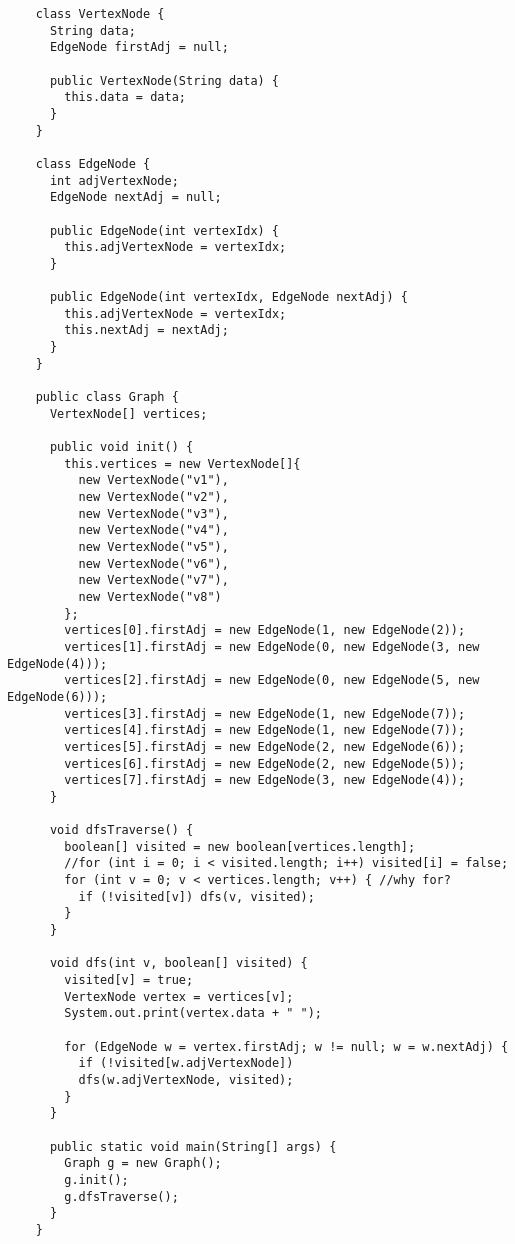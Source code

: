 \begin{frame}
  \begin{verbatim}
    class VertexNode {
      String data;
      EdgeNode firstAdj = null;

      public VertexNode(String data) {
        this.data = data;
      }
    }

    class EdgeNode {
      int adjVertexNode;
      EdgeNode nextAdj = null;

      public EdgeNode(int vertexIdx) {
        this.adjVertexNode = vertexIdx;
      }

      public EdgeNode(int vertexIdx, EdgeNode nextAdj) {
        this.adjVertexNode = vertexIdx;
        this.nextAdj = nextAdj;
      }
    }
    
    public class Graph {
      VertexNode[] vertices;

      public void init() {
        this.vertices = new VertexNode[]{
          new VertexNode("v1"),
          new VertexNode("v2"),
          new VertexNode("v3"),
          new VertexNode("v4"),
          new VertexNode("v5"),
          new VertexNode("v6"),
          new VertexNode("v7"),
          new VertexNode("v8")
        };
        vertices[0].firstAdj = new EdgeNode(1, new EdgeNode(2));
        vertices[1].firstAdj = new EdgeNode(0, new EdgeNode(3, new EdgeNode(4)));
        vertices[2].firstAdj = new EdgeNode(0, new EdgeNode(5, new EdgeNode(6)));
        vertices[3].firstAdj = new EdgeNode(1, new EdgeNode(7));
        vertices[4].firstAdj = new EdgeNode(1, new EdgeNode(7));
        vertices[5].firstAdj = new EdgeNode(2, new EdgeNode(6));
        vertices[6].firstAdj = new EdgeNode(2, new EdgeNode(5));
        vertices[7].firstAdj = new EdgeNode(3, new EdgeNode(4));
      }
      
      void dfsTraverse() {
        boolean[] visited = new boolean[vertices.length];
        //for (int i = 0; i < visited.length; i++) visited[i] = false;
        for (int v = 0; v < vertices.length; v++) { //why for?
          if (!visited[v]) dfs(v, visited);
        }
      }

      void dfs(int v, boolean[] visited) {
        visited[v] = true;
        VertexNode vertex = vertices[v];
        System.out.print(vertex.data + " ");

        for (EdgeNode w = vertex.firstAdj; w != null; w = w.nextAdj) {
          if (!visited[w.adjVertexNode])
          dfs(w.adjVertexNode, visited);
        }
      }

      public static void main(String[] args) {
        Graph g = new Graph();
        g.init();
        g.dfsTraverse();
      }
    }
  \end{verbatim}
\end{frame}

